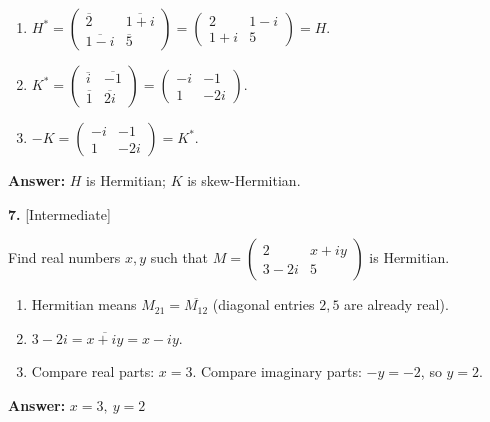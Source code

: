 \documentclass[11pt]{article}
\begin{document}
\begin{tcolorbox}[breakable,colback=ans,colframe=ansb,boxrule=0.5pt,left=4pt,right=4pt,top=2pt,bottom=2pt]\begin{enumerate}[leftmargin=2.2em,itemsep=1pt,topsep=1pt,label=\textbf{Step \arabic*.}]\item $H^{*}=\begin{pmatrix}\overline{2}&\overline{1+i}\\\overline{1-i}&\overline{5}\end{pmatrix}=\begin{pmatrix}2&1-i\\1+i&5\end{pmatrix}=H$.
\item $K^{*}=\begin{pmatrix}\overline{i}&\overline{-1}\\\overline{1}&\overline{2i}\end{pmatrix}=\begin{pmatrix}-i&-1\\1&-2i\end{pmatrix}$.
\item $-K=\begin{pmatrix}-i&-1\\1&-2i\end{pmatrix}=K^{*}$.
\end{enumerate}\textbf{Answer:} $H$ is Hermitian; $K$ is skew-Hermitian.\end{tcolorbox}
\par\vspace{2pt}
\begin{minipage}{\linewidth}\textbf{7.} \hfill{\scriptsize\color{ink}[Intermediate]}\par\nopagebreak Find real numbers $x,y$ such that $M=\begin{pmatrix}2&x+iy\\3-2i&5\end{pmatrix}$ is Hermitian.
\end{minipage}\par\nopagebreak
\begin{tcolorbox}[breakable,colback=ans,colframe=ansb,boxrule=0.5pt,left=4pt,right=4pt,top=2pt,bottom=2pt]\begin{enumerate}[leftmargin=2.2em,itemsep=1pt,topsep=1pt,label=\textbf{Step \arabic*.}]\item Hermitian means $M_{21}=\overline{M_{12}}$ (diagonal entries $2,5$ are already real).
\item $3-2i=\overline{x+iy}=x-iy$.
\item Compare real parts: $x=3$. Compare imaginary parts: $-y=-2$, so $y=2$.
\end{enumerate}\textbf{Answer:} $x=3,\ y=2$\end{tcolorbox}
\end{document}
